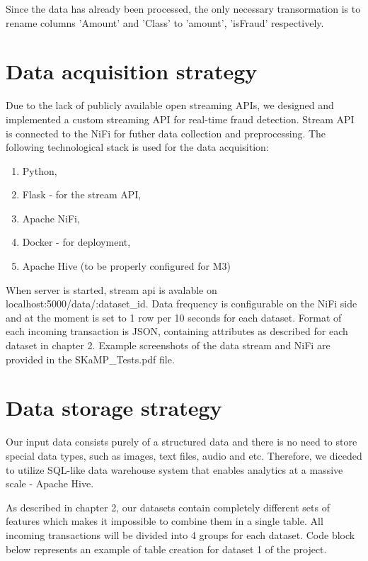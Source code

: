 \documentclass[12pt,a4paper, hidelinks]{article}
\begin{document}
Since the data has already been processed, the only necessary transormation is to rename columns 'Amount' and 'Class' to 'amount', 'isFraud' respectively.

\newpage

\section{Data acquisition strategy}

Due to the lack of publicly available open streaming APIs, we designed and implemented a custom streaming API for real-time fraud detection. Stream API is connected to the NiFi for futher data collection and preprocessing. The following technological stack is used for the data acquisition:

\begin{enumerate}
    \item Python,
    \item Flask  - for the stream API,
    \item Apache NiFi,
    \item Docker - for deployment,
    \item Apache Hive (to be properly configured for M3)
\end{enumerate}

When server is started, stream api is avalable on localhost:5000/data/:dataset\_id. Data frequency is configurable on the NiFi side and at the moment is set to 1 row per 10 seconds for each dataset. Format of each incoming transaction is JSON, containing attributes as described for each dataset in chapter 2. Example screenshots of the data stream and NiFi are provided in the SKaMP\_Tests.pdf file.

\section{Data storage strategy}

Our input data consists purely of a structured data and there is no need to store special data types, such as images, text files, audio and etc. Therefore, we diceded to utilize SQL-like data warehouse system that enables analytics at a massive scale - Apache Hive.

As described in chapter 2, our datasets contain completely different sets of features which makes it impossible to combine them in a single table. All incoming transactions will be divided into 4 groups for each dataset. Code block below represents an example of table creation for dataset 1 of the project.
\end{document}
